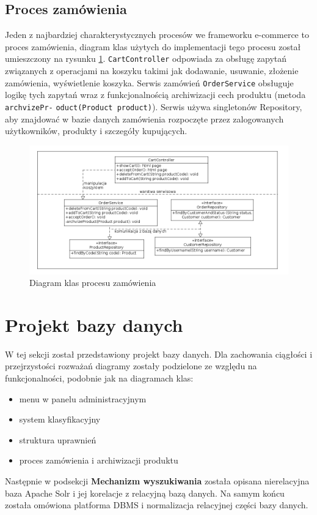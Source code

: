 \subsection{Proces zamówienia}
Jeden z najbardziej charakterystycznych procesów we frameworku e-commerce to proces zamówienia, diagram klas użytych do implementacji tego procesu został umieszczony na rysunku \ref{klasy_koszyk}. \texttt{CartController} odpowiada za obsługę zapytań związanych z operacjami na koszyku takimi jak dodawanie, usuwanie, złożenie zamówienia, wyświetlenie koszyka. Serwis zamówień \texttt{OrderService} obsługuje logikę tych zapytań wraz z funkcjonalnością archiwizacji cech produktu (metoda \texttt{archvizePr-} \texttt{oduct(Product product)}). Serwis używa singletonów Repository, aby znajdować w bazie danych zamówienia rozpoczęte przez zalogowanych użytkowników, produkty i szczegóły kupujących. 
\begin{figure}
	\begin{center}
		\includegraphics[scale=0.4]{klasy_koszyk.png}
	\end{center}
	\caption{{\color{black}Diagram klas procesu zamówienia}} \label{klasy_koszyk}
\end{figure}

\newpage
\section{Projekt bazy danych}
W tej sekcji został przedstawiony projekt bazy danych. Dla zachowania ciągłości i przejrzystości rozważań diagramy zostały podzielone ze względu na funkcjonalności, podobnie jak na diagramach klas: 
\begin{itemize}
	\item menu w panelu administracyjnym
	\item system klasyfikacyjny
	\item struktura uprawnień
	\item proces zamówienia i archiwizacji produktu
\end{itemize}
Następnie w podsekcji \textbf{Mechanizm wyszukiwania} została opisana nierelacyjna baza Apache Solr i jej korelacje z relacyjną bazą danych. Na samym końcu została omówiona platforma DBMS i normalizacja relacyjnej części bazy danych.

